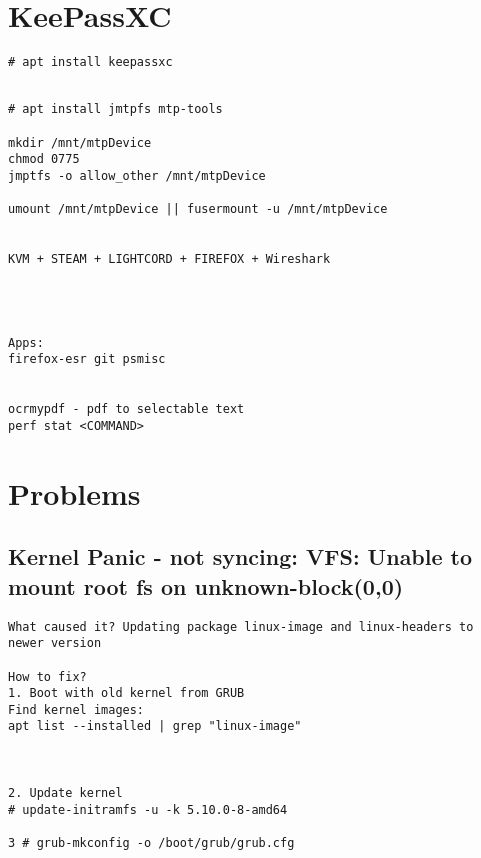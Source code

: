 \documentclass[10pt, a4paper, onecolumn, openany]{book} %
\begin{document}
\section{KeePassXC}
\begin{Verbatim}[commandchars=\\\{\}]
# apt install keepassxc


\end{Verbatim}


\begin{Verbatim}[commandchars=\\\{\}]
# apt install jmtpfs mtp-tools

mkdir /mnt/mtpDevice
chmod 0775
jmptfs -o allow_other /mnt/mtpDevice

umount /mnt/mtpDevice || fusermount -u /mnt/mtpDevice


KVM + STEAM + LIGHTCORD + FIREFOX + Wireshark




Apps:
firefox-esr git psmisc


ocrmypdf - pdf to selectable text
perf stat <COMMAND>
\end{Verbatim}


\section{Problems}
\subsection{Kernel Panic - not syncing: VFS: Unable to mount root fs on unknown-block(0,0)}
\begin{Verbatim}[commandchars=\\\{\}]
What caused it? Updating package linux-image and linux-headers to newer version

How to fix? 
1. Boot with old kernel from GRUB
Find kernel images:
apt list --installed | grep "linux-image"



2. Update kernel
# update-initramfs -u -k 5.10.0-8-amd64

3 # grub-mkconfig -o /boot/grub/grub.cfg

\end{Verbatim}
\end{document}
